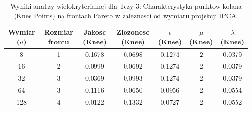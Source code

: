 \begin{table}[htbp]
\centering
\caption{Wyniki analizy wielokryterialnej dla Tezy 3: Charakterystyka punktow kolana (Knee Points) na frontach Pareto w zaleznosci od wymiaru projekcji IPCA.}
\label{tab:thesis_3_pareto_results}
\begin{tabular}{ccccccc}
\toprule
\textbf{Wymiar ($d$)} & \textbf{Rozmiar frontu} & \textbf{Jakosc (Knee)} & \textbf{Zlozonosc (Knee)} & $\epsilon$ (Knee) & $\mu$ (Knee) & $\lambda$ (Knee) \\
\midrule
8 & 1 & 0.1678 & 0.0698 & 0.1274 & 2 & 0.0379 \\
16 & 2 & 0.0999 & 0.0692 & 0.1274 & 2 & 0.0379 \\
32 & 3 & 0.0369 & 0.0993 & 0.1274 & 2 & 0.0379 \\
64 & 3 & 0.1116 & 0.0650 & 0.0956 & 2 & 0.0554 \\
128 & 4 & 0.0122 & 0.1332 & 0.0727 & 2 & 0.0552 \\
\bottomrule
\end{tabular}
\end{table}